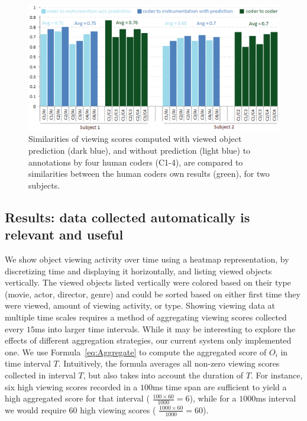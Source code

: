 \begin{figure}[htb]
  \centering
  \includegraphics[width=\linewidth]{images/quantitative.eps}
  \caption{Similarities of viewing scores computed with viewed object prediction (dark blue), and without prediction (light blue) to annotations by four human coders (C1-4), are compared to similarities between the human coders own results (green), for two subjects. }
	\label{fig:quantitative}
\end{figure}

\subsection{Results: data collected automatically is relevant and useful}
We show object viewing activity over time using a heatmap representation, by discretizing time and displaying it horizontally, and listing viewed objects vertically. The viewed objects listed vertically were colored based on their type (movie, actor, director, genre) and could be sorted based on either first time they were viewed, amount of viewing activity, or type. 
Showing viewing data at multiple time scales requires a method of aggregating viewing scores collected every $15$ms into larger time intervals. While it may be interesting to explore the effects of different aggregation strategies, our current system only implemented one. We use Formula~\ref{eq:Aggregate} to compute the aggregated score of $O_i$ in time interval $T$. Intuitively, the formula averages all non-zero viewing scores collected in interval $T$, but also takes into account the duration of $T$. For instance, six high viewing scores recorded in a $100$ms time span are sufficient to yield a high aggregated score for that interval ( $\frac{100 \times 60 }{1000} = 6$), while for a $1000$ms interval we would require $60$ high viewing scores ( $\frac{1000 \times 60 }{1000} = 60$).

